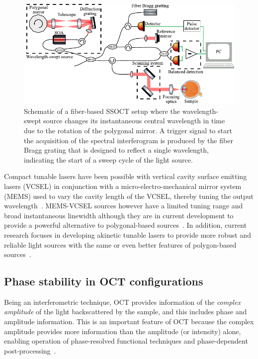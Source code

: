 \begin{figure}[htb!]
    \centering
    \includegraphics[width=\textwidth]{Figures/TheoreticalBasis/SSOCT_Scheme.pdf}
    \caption[Schematic of a fiber-based SSOCT setup.]{Schematic of a fiber-based SSOCT setup where the wavelength-swept source changes its instantaneous central wavelength in time due to the rotation of the polygonal mirror. A trigger signal to start the acquisition of the spectral interferogram is produced by the fiber Bragg grating that is designed to reflect a single wavelength, indicating the start of a sweep cycle of the light source.}
    \label{fig:SSOCT_Scheme}
\end{figure}

Compact tunable lasers have been possible with vertical cavity surface emitting lasers (VCSEL) in conjunction with a micro-electro-mechanical mirror system (MEMS) used to vary the cavity length of the VCSEL, thereby tuning the output wavelength~\cite{Vail1995_Tunable}. MEMS-VCSEL sources however have a limited tuning range and broad instantaneous linewidth although they are in current development to provide a powerful alternative to polygonal-based sources~\cite{Jayaraman2011_OCT}. In addition, current research focuses in developing akinetic tunable lasers to provide more robust and reliable light sources with the same or even better features of polygon-based sources~\cite{Lee2018_Akinetic}.

\subsection{Phase stability in OCT configurations}\label{sec:OCTConfigPhaseStab}

Being an interferometric technique, OCT provides information of the \textit{complex amplitude} of the light backscattered by the sample, and this includes phase and amplitude information. This is an important feature of OCT because the complex amplitude provides more information than the amplitude (or intensity) alone, enabling operation of phase-resolved functional techniques and phase-dependent post-processing~\cite{Park2020_Angiographic, Vakoc2005_Phaseresolved, White2003_vivo}.

